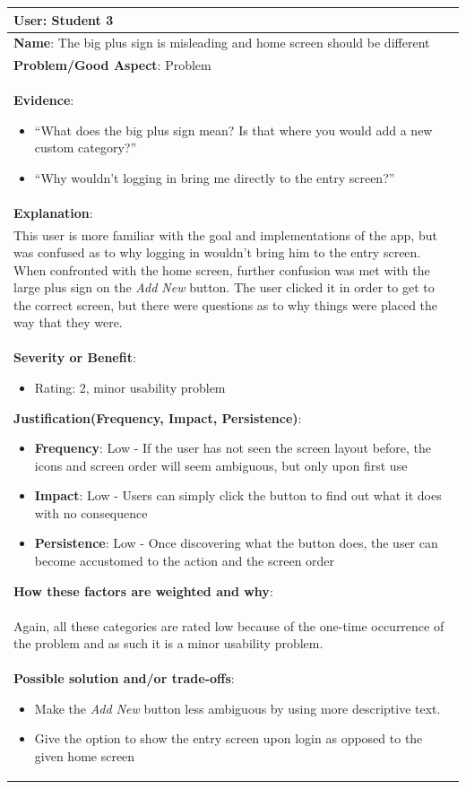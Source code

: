 \documentclass[pdftex,12pt,a4paper]{report}
\begin{document}
\begin{center}
	\begin{tabular}{|p{\textwidth}|}
	\hline
	\textbf{User}: Student 3\\
	\hline
	\textbf{Name}: The big plus sign is misleading and home screen should be different\\
	\hline
	\textbf{Problem/Good Aspect}: Problem\\
	\hline
	\textbf{Evidence}:
	\begin{itemize}
	\item{``What does the big plus sign mean? Is that where you would add a new custom category?''}
	\item{``Why wouldn't logging in bring me directly to the entry screen?''}
	\end{itemize}\\
	\hline
	\textbf{Explanation}:\\
	This user is more familiar with the goal and implementations of the app, but was confused as to why logging in wouldn't bring him to the entry screen. When confronted with the home screen, further confusion was met with the large plus sign on the \emph{Add New} button. The user clicked it in order to get to the correct screen, but there were questions as to why things were placed the way that they were.\\
	\hline
\textbf{Severity or Benefit}:
	\begin{itemize}
	\item{Rating: 2, minor usability problem}
	\end{itemize}
	\textbf{Justification(Frequency, Impact, Persistence)}:
	\begin{itemize}
	\item{\textbf{Frequency}:} Low - If the user has not seen the screen layout before, the icons and screen order will seem ambiguous, but only upon first use
	\item{\textbf{Impact}:} Low - Users can simply click the button to find out what it does with no consequence
	\item{\textbf{Persistence}:} Low - Once discovering what the button does, the user can become accustomed to the action and the screen order
	\end{itemize}
	\textbf{How these factors are weighted and why}:\\
	Again, all these categories are rated low because of the one-time occurrence of the problem and as such it is a minor usability problem.\\
	\hline
	\textbf{Possible solution and/or trade-offs}:
	\begin{itemize}
	\item{Make the \emph{Add New} button less ambiguous by using more descriptive text.}
	\item{Give the option to show the entry screen upon login as opposed to the given home screen}
	\end{itemize}\\
	\hline
	\end{tabular}
\end{center}
\end{document}

